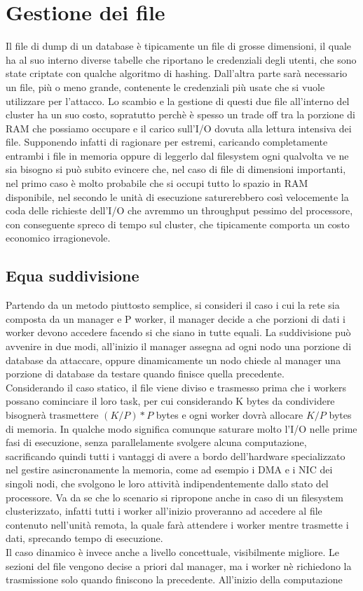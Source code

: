 \section{Gestione dei file}
Il file di dump di un database è tipicamente un file di grosse dimensioni, il quale ha al suo interno diverse tabelle che riportano le credenziali degli utenti, che sono state criptate con qualche algoritmo di hashing. Dall'altra parte sarà necessario un file, più o meno grande, contenente le credenziali più usate che si vuole utilizzare per l'attacco. Lo scambio e la gestione di questi due file all'interno del cluster ha un suo costo, sopratutto perchè è spesso un trade off tra la porzione di RAM che possiamo occupare e il carico sull'I/O dovuta alla lettura intensiva dei file. Supponendo infatti di ragionare per estremi, caricando completamente entrambi i file in memoria oppure di leggerlo dal filesystem ogni qualvolta ve ne sia bisogno si può subito evincere che, nel caso di file di dimensioni importanti, nel primo caso è molto probabile che si occupi tutto lo spazio in RAM disponibile, nel secondo le unità di esecuzione saturerebbero così velocemente la coda delle richieste dell'I/O che avremmo un throughput pessimo del processore, con conseguente spreco di tempo sul cluster, che tipicamente comporta un costo economico irragionevole. 

\subsection{Equa suddivisione}
Partendo da un metodo piuttosto semplice, si consideri il caso i cui la rete sia composta da un manager e P worker, il manager decide a che porzioni di dati i worker devono accedere facendo si che siano in tutte equali. La suddivisione può avvenire in due modi, all'inizio il manager assegna ad ogni nodo una porzione di database da attaccare, oppure dinamicamente un nodo chiede al manager una porzione di database da testare quando finisce quella precedente. \\
Considerando il caso statico, il file viene diviso e trasmesso prima che i workers possano cominciare il loro task, per cui considerando K bytes da condividere bisognerà trasmettere $(K/P)*P$ bytes e ogni worker dovrà allocare $K/P$ bytes di memoria. In qualche modo significa comunque saturare molto l'I/O nelle prime fasi di esecuzione, senza parallelamente svolgere alcuna computazione, sacrificando quindi tutti i vantaggi di avere a bordo dell'hardware specializzato nel gestire asincronamente la memoria, come ad esempio i DMA e i NIC dei singoli nodi, che svolgono le loro attività indipendentemente dallo stato del processore. Va da se che lo scenario si ripropone anche in caso di un filesystem clusterizzato, infatti tutti i worker all'inizio proveranno ad accedere al file contenuto nell'unità remota, la quale farà attendere i worker mentre trasmette i dati, sprecando tempo di esecuzione. 
\\ 
Il caso dinamico è invece anche a livello concettuale, visibilmente migliore. Le sezioni del file vengono decise a priori dal manager, ma i worker nè richiedono la trasmissione solo quando finiscono la precedente. All'inizio della computazione 
